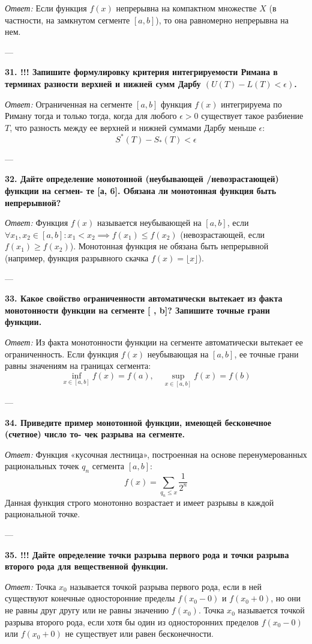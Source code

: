 \documentclass{article}
\begin{document}
\textit{Ответ:} Если функция $f(x)$ непрерывна на компактном множестве $X$ (в частности, на замкнутом сегменте $[a, b]$), то она равномерно непрерывна на нем.

---

\textbf{31. !!! Запишите формулировку критерия интегрируемости Римана в терминах разности верхней и нижней сумм Дарбу $(U(T)-L(T)<\epsilon)$.}

\textit{Ответ:} Ограниченная на сегменте $[a, b]$ функция $f(x)$ интегрируема по Риману тогда и только тогда, когда для любого $\epsilon > 0$ существует такое разбиение $T$, что разность между ее верхней и нижней суммами Дарбу меньше $\epsilon$:
$$ S^*(T) - S_*(T) < \epsilon $$

---

\textbf{32. Дайте определение монотонной (неубывающей /невозрастающей) функции на сегмен- те [а, 6]. Обязана ли монотонная функция быть непрерывной?}

\textit{Ответ:} Функция $f(x)$ называется неубывающей на $[a, b]$, если $\forall x_1, x_2 \in [a, b] : x_1 < x_2 \implies f(x_1) \le f(x_2)$ (невозрастающей, если $f(x_1) \ge f(x_2)$). Монотонная функция не обязана быть непрерывной (например, функция разрывного скачка $f(x) = \lfloor x \rfloor$).

---

\textbf{33. Какое свойство ограниченности автоматически вытекает из факта монотонности функции на сегменте [ , b]? Запишите точные грани функции.}

\textit{Ответ:} Из факта монотонности функции на сегменте автоматически вытекает ее ограниченность. Если функция $f(x)$ неубывающая на $[a, b]$, ее точные грани равны значениям на границах сегмента:
$$ \inf_{x \in [a, b]} f(x) = f(a), \quad \sup_{x \in [a, b]} f(x) = f(b) $$

---

\textbf{34. Приведите пример монотонной функции, имеющей бесконечное (счетное) число то- чек разрыва на сегменте.}

\textit{Ответ:} Функция «кусочная лестница», построенная на основе перенумерованных рациональных точек $q_n$ сегмента $[a, b]$:
$$ f(x) = \sum_{q_n \le x} \frac{1}{2^n} $$
Данная функция строго монотонно возрастает и имеет разрывы в каждой рациональной точке.

---

\textbf{35. !!! Дайте определение точки разрыва первого рода и точки разрыва второго рода для вещественной функции.}

\textit{Ответ:} Точка $x_0$ называется точкой разрыва первого рода, если в ней существуют конечные односторонние пределы $f(x_0 - 0)$ и $f(x_0 + 0)$, но они не равны друг другу или не равны значению $f(x_0)$. Точка $x_0$ называется точкой разрыва второго рода, если хотя бы один из односторонних пределов $f(x_0 - 0)$ или $f(x_0 + 0)$ не существует или равен бесконечности.
\end{document}
